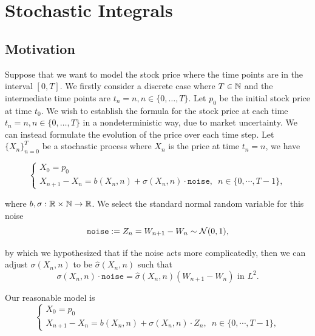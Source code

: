 \section{Stochastic Integrals}
\label{subsection:stochastic-integrals}
\subsection{Motivation}
Suppose that we want to model the stock price where the time points are in the interval $[0,T]$. We firstly consider a discrete case where $T \in \mathbb{N}$ and the intermediate time points are $t_n = n, n \in \{0,\ldots, T\}$. Let $p_0$ be the initial stock price at time $t_0$. We wish to establish the formula for the stock price at each time $t_n = n, n \in \{0,\ldots, T\}$ in a nondeterministic way, due to market uncertainty. We can instead formulate the evolution of the price over each time step. Let $\{X_n\}_{n=0}^T$ be a stochastic process where $X_n$ is the price at time $t_n=n$, we have

\begin{equation}
  \begin{cases}
    X_0= p_0 \\
    X_{n+1} - X_n = b(X_n,n) + \sigma(X_n,n)\cdot \texttt{noise}, \,\,\,n\in \{0,\cdots, T-1\},
  \end{cases}
\end{equation}

where $b,\sigma:\mathbb{R}\times\mathbb{N}\to\mathbb{R}$. We select the standard normal random variable for this noise
$$\texttt{noise}:= Z_{n} = W_{n+1}-W_n \sim \mathcal{N}(0,1),$$

by which we hypothesized that if the noise acts more complicatedly, then we can adjust $\sigma(X_n,n)$ to be $\hat{\sigma}(X_n,n)$ such that
$$\sigma(X_n,n)\cdot \texttt{noise} = \hat{\sigma}(X_n,n)(W_{n+1}-W_n) \text{ in } L^2.$$

Our reasonable model is
\begin{equation}
  \label{example:stock-price}
  \begin{cases}
    X_0= p_0 \\
    X_{n+1} - X_n = b(X_n,n) + \sigma(X_n,n)\cdot Z_{n}, \,\,\,n\in \{0,\cdots, T-1\},
  \end{cases}
\end{equation}


